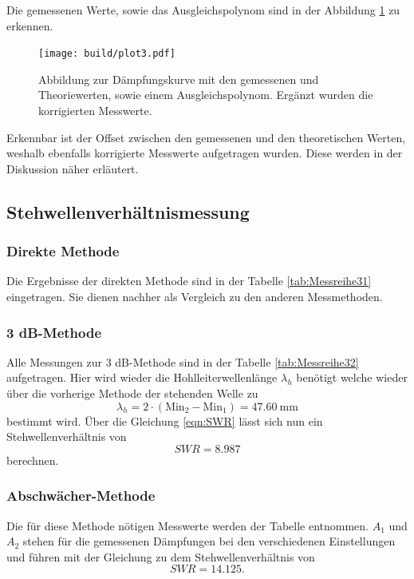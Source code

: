 Die gemessenen Werte, sowie das Ausgleichspolynom sind in der Abbildung \ref{111} zu erkennen.
\begin{figure}
    \centering
    \texttt{[image: build/plot3.pdf]}
    \caption{Abbildung zur Dämpfungskurve mit den gemessenen und Theoriewerten, sowie einem Ausgleichspolynom. Ergänzt wurden die korrigierten Messwerte.} 
    \label{111}
\end{figure}
Erkennbar ist der Offset zwischen den gemessenen und den theoretischen Werten, weshalb ebenfalls korrigierte Messwerte aufgetragen wurden. Diese werden in der Diskussion näher
erläutert.

\subsection{Stehwellenverhältnismessung}

\subsubsection{Direkte Methode}
Die Ergebnisse der direkten Methode sind in der Tabelle \ref{tab:Messreihe31} eingetragen. Sie dienen nachher als Vergleich zu den anderen Messmethoden.

\subsubsection{3 dB-Methode}
Alle Messungen zur 3 dB-Methode sind in der Tabelle \ref{tab:Messreihe32} aufgetragen. Hier wird wieder die Hohlleiterwellenlänge $\lambda_h$ 
benötigt welche wieder über die vorherige Methode der stehenden Welle zu
\begin{equation}
\lambda_h = 2 \cdot (\text{Min}_2 - \text{Min}_1) = \SI{47.60}{\milli\meter}
\end{equation}
bestimmt wird.
Über die Gleichung \ref{eqn:SWR} lässt sich nun ein Stehwellenverhältnis von
\begin{equation}
SWR = 8.987
\end{equation}
berechnen.

\subsubsection{Abschwächer-Methode}
Die für diese Methode nötigen Messwerte werden der Tabelle \label{tab:Messreihe33} entnommen.
$A_1$ und $A_2$ stehen für die gemessenen Dämpfungen bei den verschiedenen Einstellungen und führen mit der Gleichung 
\label{eqn:SWR2} zu dem Stehwellenverhältnis von
\begin{equation}
SWR = 14.125.
\end{equation}